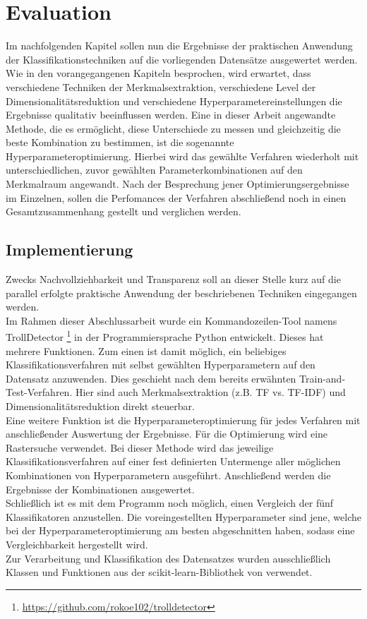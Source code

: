 \section{Evaluation}\raggedbottom
Im nachfolgenden Kapitel sollen nun die Ergebnisse der praktischen Anwendung der Klassifikationstechniken auf die vorliegenden Datensätze ausgewertet werden. Wie in den vorangegangenen Kapiteln besprochen, wird erwartet, dass verschiedene Techniken der Merkmalsextraktion, verschiedene Level der Dimensionalitätsreduktion und verschiedene Hyperparametereinstellungen die Ergebnisse qualitativ beeinflussen werden. Eine in dieser Arbeit angewandte Methode, die es ermöglicht, diese Unterschiede zu messen und gleichzeitig die beste Kombination zu bestimmen, ist die sogenannte Hyperparameteroptimierung. Hierbei wird das gewählte Verfahren wiederholt mit unterschiedlichen, zuvor gewählten Parameterkombinationen auf den Merkmalraum angewandt. Nach der Besprechung jener Optimierungsergebnisse im Einzelnen, sollen die Perfomances der Verfahren abschließend noch in einen Gesamtzusammenhang gestellt und verglichen werden.
\subsection{Implementierung} 
Zwecks Nachvollziehbarkeit und Transparenz soll an dieser Stelle kurz auf die parallel erfolgte praktische Anwendung der beschriebenen Techniken eingegangen werden.\\
Im Rahmen dieser Abschlussarbeit wurde ein Kommandozeilen-Tool namens \glqq TrollDetector\grqq{} \footnote{\url{https://github.com/rokoe102/trolldetector}} in der Programmiersprache Python entwickelt. Dieses hat mehrere Funktionen. Zum einen ist damit möglich, ein beliebiges Klassifikationsverfahren mit selbst gewählten Hyperparametern auf den Datensatz anzuwenden. Dies geschieht nach dem bereits erwähnten \glqq Train-and-Test\grqq-Verfahren. Hier sind auch Merkmalsextraktion (z.B. TF vs. TF-IDF) und Dimensionalitätsreduktion direkt steuerbar.\\
Eine weitere Funktion ist die Hyperparameteroptimierung für jedes Verfahren mit anschließender Auswertung der Ergebnisse. Für die Optimierung wird eine Rastersuche verwendet. Bei dieser Methode wird das jeweilige Klassifikationsverfahren auf einer fest definierten Untermenge aller möglichen Kombinationen von Hyperparametern ausgeführt. Anschließend werden die Ergebnisse der Kombinationen ausgewertet.\\
Schließlich ist es mit dem Programm noch möglich, einen Vergleich der fünf Klassifikatoren anzustellen. Die voreingestellten Hyperparameter sind jene, welche bei der Hyperparameteroptimierung am besten abgeschnitten haben, sodass eine Vergleichbarkeit hergestellt wird.\\
Zur Verarbeitung und Klassifikation des Datensatzes wurden ausschließlich Klassen und Funktionen aus der \glqq scikit-learn\grqq-Bibliothek von \citet{scikit-learn} verwendet.\\
\pagebreak
